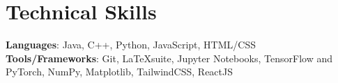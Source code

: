 \documentclass[letterpaper,11pt]{article}
\makeatletter
\newcommand{\resumeItem}[1]{
  \item\small{
    {#1 \vspace{-1pt}}
  }
}
\newcommand{\resumeProjectHeading}[2]{
    \item
    \begin{tabular*}{0.97\textwidth}{l@{\extracolsep{\fill}}r}
      \small#1 & #2 \\
    \end{tabular*}\vspace{-4pt}
}
\newcommand{\resumeSubHeadingListStart}{\begin{itemize}[leftmargin=0.15in, label={}]}
\newcommand{\resumeSubHeadingListEnd}{\end{itemize}}
\newcommand{\resumeItemListStart}{\begin{itemize}}
\newcommand{\resumeItemListEnd}{\end{itemize}\vspace{-5pt}}
\makeatother
\begin{document}
    \section{Technical Skills}
    \begin{itemize}[leftmargin=0.15in, label={}]
      \small{\item{
        \textbf{Languages}{: Java, C++, Python, JavaScript, HTML/CSS} \\
        \textbf{Tools/Frameworks}{: Git, \LaTeX\hspace{0.1cm}suite, Jupyter Notebooks, TensorFlow and PyTorch, NumPy, Matplotlib, TailwindCSS, ReactJS
        }
      }}
    \end{itemize}



\end{document}
